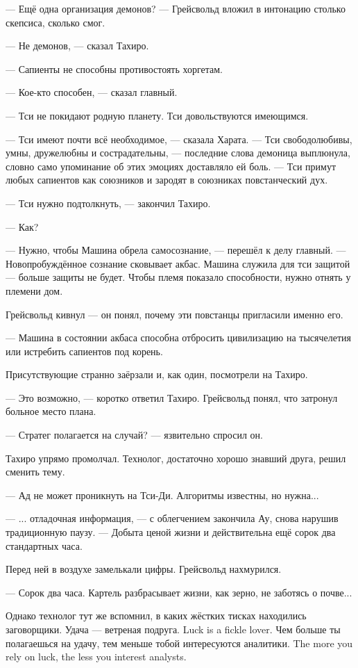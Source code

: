 --- Ещё одна организация демонов? --- Грейсвольд вложил в интонацию столько скепсиса, сколько смог.

--- Не демонов, --- сказал Тахиро.

--- Сапиенты не способны противостоять хоргетам.

--- Кое-кто способен, --- сказал главный.

--- Тси не покидают родную планету.
Тси довольствуются имеющимся.

--- Тси имеют почти всё необходимое, --- сказала Харата.
--- Тси свободолюбивы, умны, дружелюбны и сострадательны, --- последние слова демоница выплюнула, словно само упоминание об этих эмоциях доставляло ей боль.
--- Тси примут любых сапиентов как союзников и зародят в союзниках повстанческий дух.

--- Тси нужно подтолкнуть, --- закончил Тахиро.

--- Как?

--- Нужно, чтобы Машина обрела самосознание, --- перешёл к делу главный.
--- Новопробуждённое сознание сковывает акбас.
Машина служила для тси защитой --- больше защиты не будет.
Чтобы племя показало способности, нужно отнять у племени дом.

Грейсвольд кивнул --- он понял, почему эти повстанцы пригласили именно его.

--- Машина в состоянии акбаса способна отбросить цивилизацию на тысячелетия или истребить сапиентов под корень.

Присутствующие странно заёрзали и, как один, посмотрели на Тахиро.

--- Это возможно, --- коротко ответил Тахиро.
Грейсвольд понял, что затронул больное место плана.

--- Стратег полагается на случай? --- язвительно спросил он.

Тахиро упрямо промолчал.
Технолог, достаточно хорошо знавший друга, решил сменить тему.

--- Ад не может проникнуть на Тси-Ди.
Алгоритмы известны, но нужна...

--- ... отладочная информация, --- с облегчением закончила Ау, снова нарушив традиционную паузу.
--- Добыта ценой жизни и действительна ещё сорок два стандартных часа.

Перед ней в воздухе замелькали цифры.
Грейсвольд нахмурился.

--- Сорок два часа.
Картель разбрасывает жизни, как зерно, не заботясь о почве...

Однако технолог тут же вспомнил, в каких жёстких тисках находились заговорщики.
{Удача --- ветреная подруга.}
{Luck is a fickle lover.}
{Чем больше ты полагаешься на удачу, тем меньше тобой интересуются аналитики.}
{The more you rely on luck, the less you interest analysts.}

